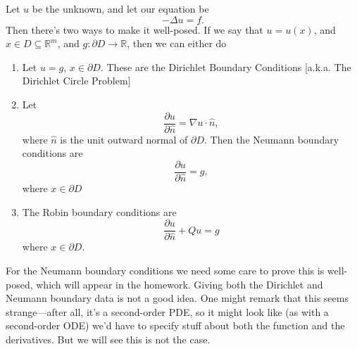 \begin{example}
	Let \( u \) be the unknown, and let our equation be
	\[ - \Delta u = f. \]
	Then there's two ways to make it well-posed. If we say that \( u = u(x) \), and \( x \in D \subseteq \mathbb{R}^{m} \), and \( g : \partial D \to \mathbb{R} \), then we can either do
	\begin{enumerate}
	
		\item Let \( u = g \), \( x \in \partial D \). These are the Dirichlet Boundary Conditions [a.k.a. The Dirichlet Circle Problem]
		\item Let
			\[ \frac{\partial u}{\partial \hat n} = \nabla u \cdot \hat n, \]
			where \( \hat n \) is the unit outward normal of \( \partial D \). Then the Neumann boundary conditions are
			\[ \frac{\partial u}{\partial \hat n} = g, \]
			where \( x \in \partial D \)
		\item The Robin boundary conditions are
			\[ \frac{\partial u}{\partial \hat n} + Qu = g \]
			where \( x \in \partial D \).
	\end{enumerate}
	For the Neumann boundary conditions we need some care to prove this is well-posed, which will appear in the homework. Giving both the Dirichlet and Neumann boundary data is not a good idea. One might remark that this seems strange---after all, it's a second-order PDE, so it might look like (as with a second-order ODE) we'd have to specify stuff about both the function and the derivatives. But we will see this is not the case.
\end{example}

